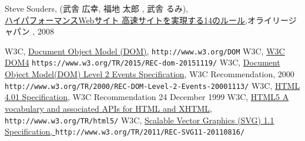 \begin{thebibliography}{99}
 Steve Souders,  (武舎 広幸, 福地 太郎 , 武舎 るみ),\\
\href{http://www.amazon.co.jp/%E3%83%8F%E3%82%A4%E3%83%91%E3%83%95%E3%82%A9%E3%83%BC%E3%83%9E%E3%83%B3%E3%82%B9Web%E3%82%B5%E3%82%A4%E3%83%88-%E2%80%95%E9%AB%98%E9%80%9F%E3%82%B5%E3%82%A4%E3%83%88%E3%82%92%E5%AE%9F%E7%8F%BE%E3%81%99%E3%82%8B14%E3%81%AE%E3%83%AB%E3%83%BC%E3%83%AB-Steve-Souders/dp/487311361X/ref=sr_1_1?ie=UTF8&qid=1304731142&sr=8-1}
{ハイパフォーマンスWebサイト  高速サイトを実現する14のルール},オライリージャパン , 2008

\iffalse
 \bibitem{Stark}Jonathan Stark(増井 俊之, 牧野 聡 訳),\\
\href{http://www.amazon.co.jp/gp/product/4873114616/ref=cm_cr_asin_lnk}
{iPhoneアプリケーション開発ガイド　 HTML+CSS+JavaScript による開発手法},
オライリージャパン, 2010
\fi
 W3C, \href{http://www.w3.org/DOM}{Document Object Model (DOM)},
	 {\texttt{http://www.w3.org/DOM}}
 W3C,
				 \href{https://www.w3.org/TR/2015/REC-dom-20151119/}{W3C DOM4}
				 {\texttt{https://www.w3.org/TR/2015/REC-dom-20151119/}}
 W3C, 
\href{http://www.w3.org/TR/2000/REC-DOM-Level-2-Events-20001113/}
{Document Object Model(DOM) Level 2 Events Specification},
    W3C Recommendation, 2000
\texttt{http://www.w3.org/TR/2000/REC-DOM-Level-2-Events-20001113/}
 W3C, 
\href{http://www.w3.org/TR/html401/}
{HTML 4.01 Specification}, W3C Recommendation 24 December 1999
 W3C, \href{http://www.w3.org/TR/html5/}{HTML5
A vocabulary and associated APIs for HTML and XHTML}, \newline\texttt{http://www.w3.org/TR/html5/}
 W3C, \href{http://www.w3.org/TR/2011/REC-SVG11-20110816/}
      {Scalable Vector Graphics (SVG) 1.1 Specification, \protect\newline}
             {\texttt{http://www.w3.org/TR/2011/REC-SVG11-20110816/}}


\end{thebibliography}
